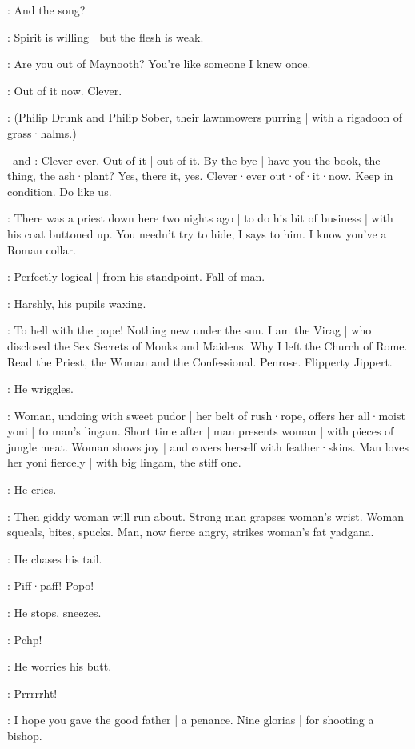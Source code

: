 \Florry:
And the song?

\Stephen:
Spirit is willing |
but the flesh is weak.

\Florry:
Are you out of Maynooth?
You're like someone I knew once.

\Stephen:
Out of it now.
Clever.

:
(Philip Drunk and Philip Sober,
their lawnmowers purring |
with a rigadoon of grass·halms.)

\PhilipDrunk\ and \PhilipSober:
Clever ever.
Out of it |
out of it.
By the bye |
have you the book,
the thing,
the ash·plant?
Yes,
there it,
yes.
Clever·ever out·of·it·now.
Keep in condition.
Do like us.

\Zoe:
There was a priest down here two nights ago |
to do his bit of business |
with his coat buttoned up.
You needn't try to hide,
I says to him.
I know you've a Roman collar.

\Virag:
Perfectly logical |
from his standpoint.
Fall of man.

:
Harshly,
his pupils waxing.

\Virag:
To hell with the pope!
Nothing new under the sun.
I am the Virag |
who disclosed the Sex Secrets of Monks and Maidens.
Why I left the Church of Rome.
Read the Priest,
the Woman and the Confessional.
Penrose.
Flipperty Jippert.

:
He wriggles.

\Virag:
Woman,
undoing with sweet pudor |
her belt of rush·rope,
offers her all·moist yoni |
to man's lingam.
Short time after |
man presents woman |
with pieces of jungle meat.
Woman shows joy |
and covers herself with feather·skins.
Man loves her yoni fiercely |
with big lingam,
the stiff one.

:
He cries.

\Virag:
Then giddy woman will run about.
Strong man grapses woman's wrist.
Woman squeals,
bites,
spucks.
Man,
now fierce angry,
strikes woman's fat yadgana.

:
He chases his tail.

\Virag:
Piff·paff!
Popo!

:
He stops,
sneezes.

\Virag:
Pchp!

:
He worries his butt.

\Virag:
Prrrrrht!

\Lynch[2]:
I hope you gave the good father |
a penance.
Nine glorias |
for shooting a bishop.

